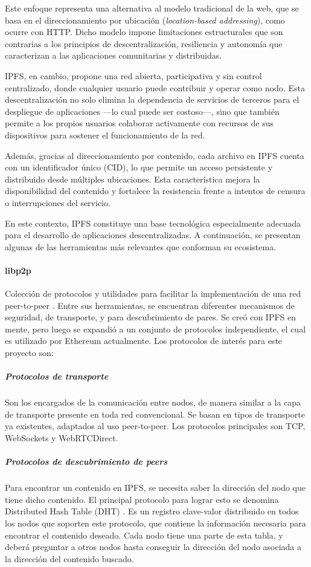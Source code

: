 Este enfoque representa una alternativa al modelo tradicional de la web, que se basa en el direccionamiento por ubicación (\textit{location-based addressing}), como ocurre con HTTP. Dicho modelo impone limitaciones estructurales que son contrarias a los principios de descentralización, resiliencia y autonomía que caracterizan a las aplicaciones comunitarias y distribuidas.

IPFS, en cambio, propone una red abierta, participativa y sin control centralizado, donde cualquier usuario puede contribuir y operar como nodo. Esta descentralización no solo elimina la dependencia de servicios de terceros para el despliegue de aplicaciones —lo cual puede ser costoso—, sino que también permite a los propios usuarios colaborar activamente con recursos de sus dispositivos para sostener el funcionamiento de la red.

Además, gracias al direccionamiento por contenido, cada archivo en IPFS cuenta con un identificador único (CID), lo que permite un acceso persistente y distribuido desde múltiples ubicaciones. Esta característica mejora la disponibilidad del contenido y fortalece la resistencia frente a intentos de censura o interrupciones del servicio.

En este contexto, IPFS constituye una base tecnológica especialmente adecuada para el desarrollo de aplicaciones descentralizadas. A continuación, se presentan algunas de las herramientas más relevantes que conforman su ecosistema.

\paragraph{libp2p} Colección de protocolos y utilidades para facilitar la implementación de una red peer-to-peer \cite{libp2p}. Entre sus herramientas, se encuentran diferentes mecanismos de seguridad, de transporte, y para descubrimiento de pares. Se creó con IPFS en mente, pero luego se expandió a un conjunto de protocolos independiente, el cual es utilizado por Ethereum actualmente. Los protocolos de interés para este proyecto son:
\subparagraph{Protocolos de transporte} Son los encargados de la comunicación entre nodos, de manera similar a la capa de transporte presente en toda red convencional. Se basan en tipos de transporte ya existentes, adaptados al uso peer-to-peer. Los protocolos principales son TCP, WebSockets y WebRTCDirect.
\subparagraph{Protocolos de descubrimiento de peers} Para encontrar un contenido en IPFS, se necesita saber la dirección del nodo que tiene dicho contenido. El principal protocolo para lograr esto se denomina Distributed Hash Table (DHT) \cite{dht} \cite{kadmelia}. Es un registro clave-valor distribuido en todos los nodos que soporten este protocolo, que contiene la información necesaria para encontrar el contenido deseado. Cada nodo tiene una parte de esta tabla, y deberá preguntar a otros nodos hasta conseguir la dirección del nodo asociada a la dirección del contenido buscado.

